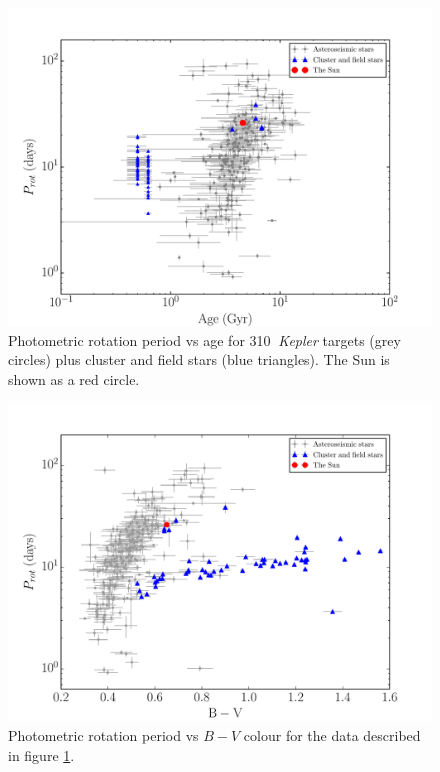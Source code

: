 \documentclass[useAMS, usenatbib]{mn2e}
\newcommand{\nastero}{310}
\begin{document}
\begin{figure}
\begin{center}
\includegraphics[width=6in, clip=true]{p_vs_a_paper2.pdf}
\caption{Photometric rotation period vs age for \nastero$~$ {\it Kepler}
	targets (grey circles) plus cluster and field stars (blue
	triangles). The Sun is shown as a red circle.
\label{fig:p_vs_a}}
\end{center}
\end{figure}

\begin{figure}
\begin{center}
\includegraphics[width=6in, clip=true, trim=0 0 0.5in 0]{p_vs_bv_paper2.pdf}
\caption{Photometric rotation period vs $B-V$ colour for the data described in
	figure \ref{fig:p_vs_a}.
\label{fig:3d}}
\end{center}
\end{figure}
\end{document}
